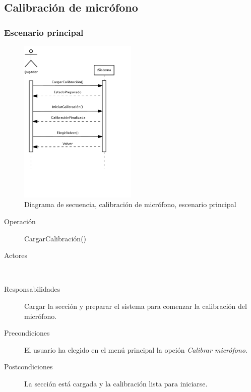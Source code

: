 
\subsection{Calibración de micrófono}

\subsubsection{Escenario principal}
\begin{figure}[h!]
  \centering
  \includegraphics[trim=0cm 8cm 0cm 0cm, clip=true, width=0.5\textwidth]{4_analisis/diagsec_caso6_esc1}
  \caption{Diagrama de secuencia, calibración de micrófono, escenario principal}
\end{figure}

\begin{description}
\item[Operación] CargarCalibración()
\item[Actores] \jugador\, \sistema\
\item[Responsabilidades] Cargar la sección y preparar el sistema para comenzar
  la calibración del micrófono.
\item[Precondiciones] El usuario ha elegido en el menú principal la opción
  \textit{Calibrar micrófono}.
\item[Postcondiciones] La sección está cargada y la calibración lista para
  iniciarse.
\end{description}

